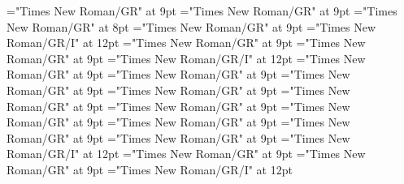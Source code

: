 \documentclass[gps1,twoside]{article}
\begin{document}
\font\spanspandefinitionorglosssensesensessensesensessubentrysubentriesentrybefore="Times New Roman/GR" at 9pt
\font\spandefinitionorglosssensesensessensesensessubentrysubentriesentrylastchildafter="Times New Roman/GR" at 9pt
\font\exampleexampleexamplessensesensessensesensessubentrysubentriesentrybefore="Times New Roman/GR" at 8pt
\font\examplessensesensessensesensessubentrysubentriesentryafter="Times New Roman/GR" at 9pt
\font\spanbzhexampleexampleexamplessensesensessensesensessubentrysubentriesentry="Times New Roman/GR/I" at 12pt
\font\spanspanexampleexampleexamplessensesensessensesensessubentrysubentriesentrybefore="Times New Roman/GR" at 9pt
\font\spanexampleexampleexamplessensesensessensesensessubentrysubentriesentrylastchildafter="Times New Roman/GR" at 9pt
\font\spanexampleexampleexamplessensesensessensesensessubentrysubentriesentry="Times New Roman/GR/I" at 12pt
\font\spanspantranslationtranslationtranslationsexampleexamplessensesensessensesensessubentrysubentriesentrybefore="Times New Roman/GR" at 9pt
\font\spantranslationtranslationtranslationsexampleexamplessensesensessensesensessubentrysubentriesentrylastchildafter="Times New Roman/GR" at 9pt
\font\spanspanencyclopedicinfosensesensessensesensessubentrysubentriesentrybefore="Times New Roman/GR" at 9pt
\font\spanencyclopedicinfosensesensessensesensessubentrysubentriesentryfirstchildbefore="Times New Roman/GR" at 9pt
\font\spanencyclopedicinfosensesensessensesensessubentrysubentriesentrylastchildafter="Times New Roman/GR" at 9pt
\font\spanspanrestrictionssensesensessensesensessubentrysubentriesentrybefore="Times New Roman/GR" at 9pt
\font\spanrestrictionssensesensessensesensessubentrysubentriesentryfirstchildbefore="Times New Roman/GR" at 9pt
\font\spanrestrictionssensesensessensesensessubentrysubentriesentrylastchildafter="Times New Roman/GR" at 9pt
\font\spanspanlexsensereferencessensesensessensesensessubentrysubentriesentrybefore="Times New Roman/GR" at 9pt
\font\lexsensereferencessensesensessensesensessubentrysubentriesentryafter="Times New Roman/GR" at 9pt
\font\spanenownertypeabbreviationlexsensereferencelexsensereferencessensesensessensesensessubentrysubentriesentry="Times New Roman/GR/I" at 12pt
\font\spanspanownertypeabbreviationlexsensereferencelexsensereferencessensesensessensesensessubentrysubentriesentrybefore="Times New Roman/GR" at 9pt
\font\spanownertypeabbreviationlexsensereferencelexsensereferencessensesensessensesensessubentrysubentriesentrylastchildafter="Times New Roman/GR" at 9pt
\font\spanownertypeabbreviationlexsensereferencelexsensereferencessensesensessensesensessubentrysubentriesentry="Times New Roman/GR/I" at 12pt
\end{document}
